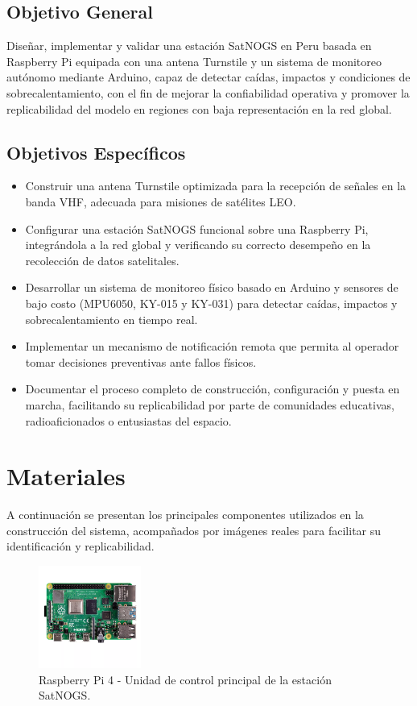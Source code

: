\documentclass[conference]{IEEEtran}
\begin{document}
\subsection{Objetivo General}
Diseñar, implementar y validar una estación SatNOGS en Peru basada en Raspberry Pi equipada con una antena Turnstile y un sistema de monitoreo autónomo mediante Arduino, capaz de detectar caídas, impactos y condiciones de sobrecalentamiento, con el fin de mejorar la confiabilidad operativa y promover la replicabilidad del modelo en regiones con baja representación en la red global.

\subsection{Objetivos Específicos}
\begin{itemize}
    \item Construir una antena Turnstile optimizada para la recepción de señales en la banda VHF, adecuada para misiones de satélites LEO.
    \item Configurar una estación SatNOGS funcional sobre una Raspberry Pi, integrándola a la red global y verificando su correcto desempeño en la recolección de datos satelitales.
    \item Desarrollar un sistema de monitoreo físico basado en Arduino y sensores de bajo costo (MPU6050, KY-015 y KY-031) para detectar caídas, impactos y sobrecalentamiento en tiempo real.
    \item Implementar un mecanismo de notificación remota que permita al operador tomar decisiones preventivas ante fallos físicos.
    \item Documentar el proceso completo de construcción, configuración y puesta en marcha, facilitando su replicabilidad por parte de comunidades educativas, radioaficionados o entusiastas del espacio.
\end{itemize}

\section{Materiales}

A continuación se presentan los principales componentes utilizados en la construcción del sistema, acompañados por imágenes reales para facilitar su identificación y replicabilidad.

\begin{figure}[H]
    \centering
    \includegraphics[width=0.3\textwidth]{figs/raspberrypi4.png}
    \caption{Raspberry Pi 4 - Unidad de control principal de la estación SatNOGS.}
    \label{fig:raspberry}
\end{figure}
\end{document}
